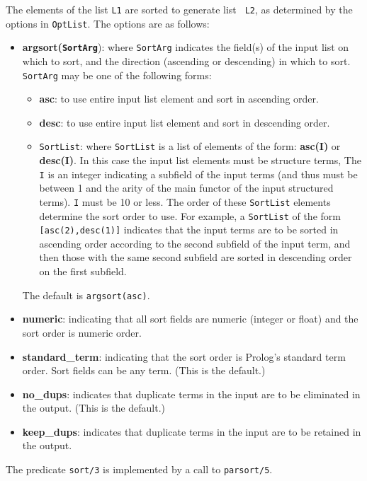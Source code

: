 \begin{description}
\label{sort/3}
%
    The elements of the list {\tt L1} are sorted to generate list {\tt
      L2}, as determined by the options in {\tt OptList}.  The options
    are as follows:
    \begin{itemize}
      \item{{\bf argsort({\tt SortArg}})}: where {\tt SortArg} indicates the
        field(s) of the input list on which to sort, and the direction
        (ascending or descending) in which to sort.  {\tt SortArg} may
        be one of the following forms:
        \begin{itemize}
          \item{{\bf asc}}: to use entire input list element and sort in
            ascending order.
          \item{{\bf desc}}: to use entire input list element and sort in
            descending order.
            \item{{\tt SortList}}: where {\tt SortList} is a list of
              elements of the form: {\bf asc(I)} or {\bf desc(I)}.  In
              this case the input list elements must be structure
              terms, The {\tt I} is an integer indicating a subfield
              of the input terms (and thus must be between 1 and the
              arity of the main functor of the input structured
              terms).  {\tt I} must be 10 or less. The order of these
              {\tt SortList} elements determine the sort order to use.
              For example, a {\tt SortList} of the form {\tt
                [asc(2),desc(1)]} indicates that the input terms are
              to be sorted in ascending order according to the second
              subfield of the input term, and then those with the same
              second subfield are sorted in descending order on the
              first subfield.
        \end{itemize}
        The default is {\tt argsort(asc)}.
      \item{{\bf numeric}}: indicating that all sort fields are numeric
        (integer or float) and the sort order is numeric order.
      \item{{\bf standard\_term}}: indicating that the sort order is Prolog's
        standard term order.  Sort fields can be any term.  (This is
        the default.)
      \item{{\bf no\_dups}}: indicates that duplicate terms in the input are
        to be eliminated in the output.  (This is the default.)
      \item{{\bf keep\_dups}}: indicates that duplicate terms in the input are
        to be retained in the output.
    \end{itemize}
    The predicate {\tt sort/3} is implemented by a call to {\tt parsort/5}.


\end{description}
